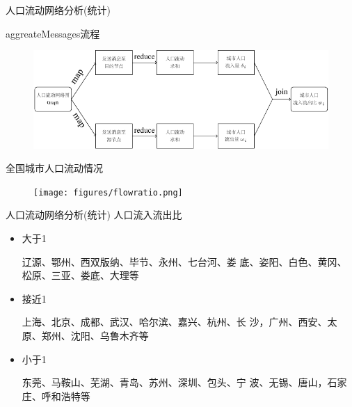 \begin{frame}[t]{人口流动网络分析(统计)}

    aggreateMessages流程

    \begin{figure}
        \centering
        \includegraphics[width=0.7 \linewidth]{figures/population_statistic.pdf}
    \end{figure}
    
    \pause

    全国城市人口流动情况
    \begin{figure}
        \centering
         \texttt{[image: figures/flowratio.png]}
    \end{figure}
   


\end{frame}

\begin{frame}[t]{人口流动网络分析(统计)}
    人口流入流出比
    
    \begin{itemize}
        \pause
        \item \alert{大于1}

        辽源、鄂州、西双版纳、毕节、永州、七台河、娄 底、姿阳、白色、黄冈、松原、三亚、娄底、大理等

        \pause
        \item \alert{接近1}

        上海、北京、成都、武汉、哈尔滨、嘉兴、杭州、长 沙，广州、西安、太原、郑州、沈阳、乌鲁木齐等

        \pause
        \item \alert{小于1}

        东莞、马鞍山、芜湖、青岛、苏州、深圳、包头、宁 波、无锡、唐山，石家庄、呼和浩特等
    \end{itemize}
\end{frame}

